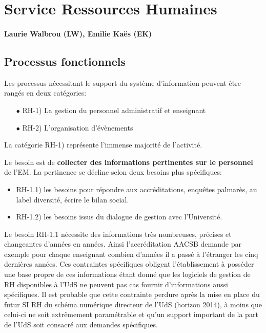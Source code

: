\documentclass{book}
\begin{document}
	


\section{Service Ressources Humaines}

\paragraph{Laurie Walbrou (LW), Emilie Kaës (EK)}


\subsection{Processus fonctionnels}
\label{sc:rh-process}
Les processus nécessitant le support du système d'information peuvent 
être rangés en deux catégories:
\begin{itemize}
\item[$\bullet$] RH-1) La gestion du personnel administratif et enseignant
\item[$\bullet$] RH-2) L'organisation d'évènements
\end{itemize}
\bigskip

La catégorie RH-1) représente l'immense majorité de l'activité.

Le besoin est de \textbf{collecter des informations pertinentes
sur le personnel} de l'EM. La pertinence se décline selon
deux besoins plus spécifiques:
\begin{itemize}
\item RH-1.1) les besoins pour répondre aux accréditations, enquêtes 
	palmarès, au label diversité, écrire le bilan social.
\item RH-1.2) les besoins issus du dialogue de gestion avec l'Université.
\end{itemize}

\bigskip

Le  besoin  RH-1.1  nécessite  des informations  très  nombreuses,  précises  et
changeantes d'années en années. Ainsi  l'accréditation AACSB demande par exemple
pour  chaque enseignant  combien  d'années  il a  passé  à  l'étranger les  cinq
dernières  années.  Ces  contraintes   spécifiques  obligent  l'établissement  à
posséder une  base propre de ces  informations étant donné que  les logiciels de
gestion de  RH disponibles  à l'UdS  ne peuvent  pas cas  fournir d'informations
aussi spécifiques. Il est probable que cette contrainte perdure après la mise en
place du futur  SI RH du schéma  numérique directeur de l'UdS  (horizon 2014), à
moins que celui-ci  ne soit extrêmement paramétrable et  qu'un support important
de la part de l'UdS soit consacré aux demandes spécifiques.\\
\end{document}
